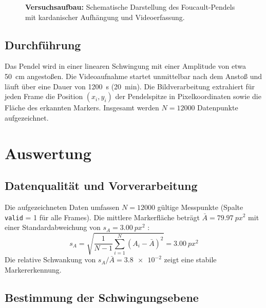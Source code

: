 \documentclass[a4paper,12pt]{article}
\begin{document}
\begin{figure}[h]
\centering
{}
\caption{\textbf{Versuchsaufbau:} Schematische Darstellung des Foucault-Pendels mit kardanischer Aufhängung und Videoerfassung.}
\label{fig:aufbau}
\end{figure}

\subsection{Durchführung}

Das Pendel wird in einer linearen Schwingung mit einer Amplitude von etwa \qty{50}{cm} angestoßen. Die Videoaufnahme startet unmittelbar nach dem Anstoß und läuft über eine Dauer von \qty{1200}{s} (\qty{20}{min}). Die Bildverarbeitung extrahiert für jeden Frame die Position $(x_i, y_i)$ der Pendelspitze in Pixelkoordinaten sowie die Fläche des erkannten Markers. Insgesamt werden $N = 12000$ Datenpunkte aufgezeichnet.

\section{Auswertung}

\subsection{Datenqualität und Vorverarbeitung}

Die aufgezeichneten Daten umfassen $N = 12000$ gültige Messpunkte (Spalte \texttt{valid} = 1 für alle Frames). Die mittlere Markerfläche beträgt $\bar{A} = \qty{79.97}{px^2}$ mit einer Standardabweichung von $s_A = \qty{3.00}{px^2}$ \cite[Gl.~7, S.~7]{mallick2025}:
\begin{equation}
s_A = \sqrt{\frac{1}{N-1}\sum_{i=1}^{N}(A_i - \bar{A})^2} = \qty{3.00}{px^2}
\end{equation}
Die relative Schwankung von $s_A/\bar{A} = \num{3.8e-2}$ zeigt eine stabile Markererkennung.

\subsection{Bestimmung der Schwingungsebene}
\end{document}
